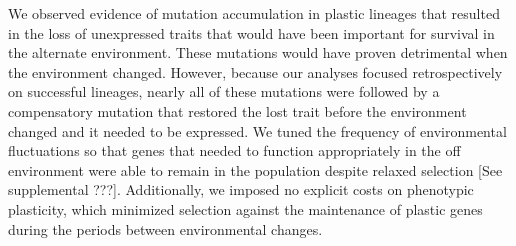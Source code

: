 

We observed evidence of mutation accumulation in plastic lineages that resulted in the loss of unexpressed traits that would have been important for survival in the alternate environment.
These mutations would have proven detrimental when the environment changed.
However, because our analyses focused retrospectively on successful lineages, nearly all of these mutations were followed by a compensatory mutation that restored the lost trait before the environment changed and it needed to be expressed.
We tuned the frequency of environmental fluctuations so that genes that needed to function appropriately in the off environment were able to remain in the population despite relaxed selection [See supplemental ???].
Additionally, we imposed no explicit costs on phenotypic plasticity, which minimized selection against the maintenance of plastic genes during the periods between environmental changes.  

